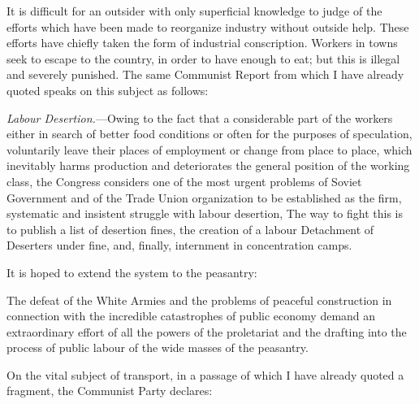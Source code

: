 It is difficult for an outsider with only superficial knowledge to judge of the efforts which have been made to reorganize industry without outside help. These efforts have chiefly taken the form of industrial conscription. Workers in towns seek to escape to the country, in order to have enough to eat; but this is illegal and severely punished. The same Communist Report from which I have already quoted speaks on this subject as follows:
\begin{displayquote}
\emph{Labour Desertion.}---Owing to the fact that a considerable part of the workers either in search of better food conditions or often for the purposes of speculation, voluntarily leave their places of employment or change from place to place, which inevitably harms production and deteriorates the general position of the working class, the Congress considers one of the most urgent problems of Soviet Government and of the Trade Union organization to be established as the firm, systematic and insistent struggle with labour desertion, The way to fight this is to publish a list of desertion fines, the creation of a labour Detachment of Deserters under fine, and, finally, internment in concentration camps.
\end{displayquote}
It is hoped to extend the system to the peasantry:
\begin{displayquote}
The defeat of the White Armies and the problems of peaceful construction in connection with the incredible catastrophes of public economy demand an extraordinary effort of all the powers of the proletariat and the drafting into the process of public labour of the wide masses of the peasantry.
\end{displayquote}
On the vital subject of transport, in a passage of which I have already quoted a fragment, the Communist Party declares:
